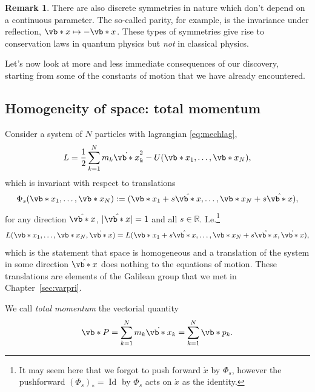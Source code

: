 \documentclass[english,fontsize=11pt,paper=b5]{scrbook}
\DeclareMathOperator{\Id}{Id}
\DeclareMathOperator{\Id}{Id}
\theoremstyle{definition}
\newtheorem{remark}{Remark}[chapter]
\begin{document}
    \begin{remark}
      There are also discrete symmetries in nature which don't depend on a continuous parameter. The so-called parity, for example, is the invariance under reflection, $\vb*{x} \mapsto -\vb*{x}$.
      These types of symmetries give rise to conservation laws in quantum physics but \emph{not} in classical physics.
    \end{remark}

    Let's now look at more and less immediate consequences of our discovery, starting from some of the constants of motion that we have already encountered.

    \subsection{Homogeneity of space: total momentum}

    Consider a system of $N$ particles with lagrangian \eqref{eq:mechlag},
    \begin{equation}
      L = \frac12 \sum_{k=1}^N m_k \dot{\vb*{x}}_k^2 - U(\vb*{x}_1, \ldots, \vb*{x}_N),
    \end{equation}
    which is invariant with respect to translations
    \begin{equation}
      \Phi_s(\vb*{x}_1, \ldots, \vb*{x}_N) := (\vb*{x}_1 + s \hat{\vb*{x}},\ldots, \vb*{x}_N + s \hat{\vb*{x}}),
    \end{equation}
    for any direction $\hat{\vb*{x}}$, $|\hat{\vb*{x}}|=1$ and all $s\in\mathbb{R}$. I.e.\footnote{It may seem here that we forgot to push forward $\dot x$ by $\Phi_s$, however the pushforward $(\Phi_s)_* = \Id$ by $\Phi_s$ acts on $\dot x$ as the identity.}
    \begin{equation}
      L(\vb*{x}_1, \ldots, \vb*{x}_N, \dot{\vb*{x}}) = L(\vb*{x}_1 + s \hat{\vb*{x}}, \ldots, \vb*{x}_N + s \hat{\vb*{x}}, \dot{\vb*{x}}),
    \end{equation}
    which is the statement that space is homogeneous and a translation of the system in some direction $\hat{\vb*{x}}$ does nothing to the equations of motion. These translations are elements of the Galilean group that we met in Chapter~\ref{sec:varpri}.

    We call \emph{total momentum} the vectorial quantity
    \begin{equation}
      \vb*{P} = \sum_{k=1}^N m_k \dot{\vb*{x}}_k = \sum_{k=1}^N \vb*{p}_k.
    \end{equation}
\end{document}
